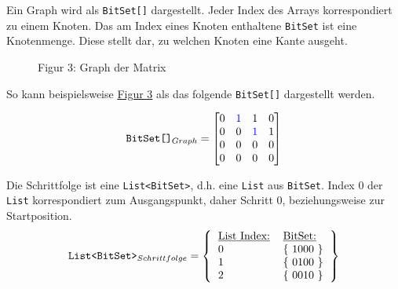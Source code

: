 \documentclass[a4paper,10pt,ngerman]{scrartcl}
\begin{document}
    Ein Graph wird als \texttt{BitSet[]} dargestellt.
    Jeder Index des Arrays korrespondiert zu einem Knoten.
    Das am Index eines Knoten enthaltene \texttt{BitSet} ist eine Knotenmenge.
    Diese stellt dar, zu welchen Knoten eine Kante ausgeht.

    \begin{figure}[!h]
        \centering
        \caption{Figur 3: Graph der Matrix}

        \label{fig:Figure3}
    \end{figure}

    So kann beispielsweise \hyperref[fig:Figure3]{Figur 3} als das folgende \texttt{BitSet[]} dargestellt werden.

    \[
        \texttt{BitSet[]}_{Graph} = \begin{bmatrix}
                                        0 & \textcolor{blue}{1} & 1                   & 0 \\
                                        0 & 0                   & \textcolor{blue}{1} & 1 \\
                                        0 & 0                   & 0                   & 0 \\
                                        0 & 0                   & 0                   & 0 \\
        \end{bmatrix}
    \]

    Die Schrittfolge ist eine \texttt{List<BitSet>},
    d.h. eine \texttt{List} aus \texttt{BitSet}.
    Index 0 der \texttt{List} korrespondiert zum Ausgangspunkt,
    daher Schritt 0, beziehungsweise zur Startposition.
    \[
        \texttt{List<BitSet>}_{Schrittfolge} = \left\lbrace
        \begin{tabular}{ll}
            \underline{\text{List Index:}} & \underline{\text{BitSet:}} \\
            0                              & \{ 1000 \}                 \\
            1                              & \{ 0100 \}                 \\
            2                              & \{ 0010 \}                 \\
        \end{tabular}
        \right\rbrace
    \]
\end{document}
